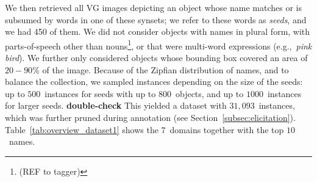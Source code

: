 We then retrieved all VG images depicting an object whose name matches or is subsumed by words in one of these synsets; we refer to these words as \textit{seeds}, and we had 450 of them.
We did not consider objects with names in plural form, with parts-of-speech other than nouns\footnote{(REF to tagger)}, or that were multi-word expressions (e.g.,~\textsl{pink bird}). 
We further only considered objects whose bounding box covered an area of~$20-90\%$ of the image.
Because of the Zipfian distribution of names, and to balance the collection, we sampled instances depending on the size of the seeds: up to $500$\ instances for seeds with up to $800$\ objects, and up to $1000$\ instances for larger seeds. \textbf{double-check}
This yielded a dataset with $31,093$~instances, which was further pruned during annotation (see Section\ \ref{subsec:elicitation}). 
Table~\ref{tab:overview_dataset1} shows the $7$\ domains together with the top $10$\ \vg names.


